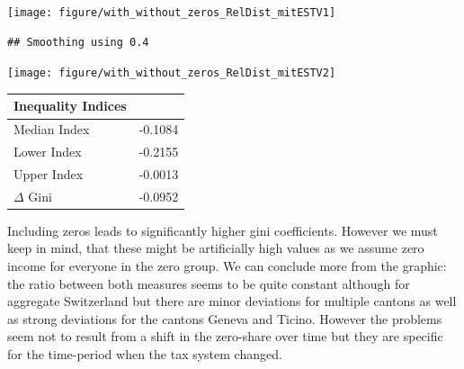 \documentclass[twoside]{article}\usepackage[]{graphicx}\usepackage[]{color}
\makeatletter
\newenvironment{kframe}{%
 \def\at@end@of@kframe{}%
 \ifinner\ifhmode%
  \def\at@end@of@kframe{\end{minipage}}%
  \begin{minipage}{\columnwidth}%
 \fi\fi%
 \def\FrameCommand##1{\hskip\@totalleftmargin \hskip-\fboxsep
 \colorbox{shadecolor}{##1}\hskip-\fboxsep
     \hskip-\linewidth \hskip-\@totalleftmargin \hskip\columnwidth}%
 \MakeFramed {\advance\hsize-\width
   \@totalleftmargin\z@ \linewidth\hsize
   \@setminipage}}%
 {\par\unskip\endMakeFramed%
 \at@end@of@kframe}
\newenvironment{knitrout}{}{} %
\makeatother
\begin{document}
\begin{multicols}{2}

\begin{knitrout}
\color{fgcolor}\begin{kframe}


{\ttfamily\noindent\bfseries\color{errorcolor}{\#\# Error: Objekt 'estvReink' nicht gefunden}}

{\ttfamily\noindent\bfseries\color{errorcolor}{\#\# Error: undefined columns selected}}\end{kframe}
\texttt{[image: figure/with\_without\_zeros\_RelDist\_mitESTV1]} 
\begin{kframe}\begin{verbatim}
## Smoothing using 0.4
\end{verbatim}
\end{kframe}
\texttt{[image: figure/with\_without\_zeros\_RelDist\_mitESTV2]} 

\end{knitrout}

%
\begin{center}
\begin{tabular}{ll}
\hline\hline
\multicolumn{1}{l}{Inequality Indices}&\multicolumn{1}{c}{}\tabularnewline
\hline
Median Index&-0.1084\tabularnewline
Lower Index&-0.2155\tabularnewline
Upper Index&-0.0013\tabularnewline
$\Delta$ Gini&-0.0952\tabularnewline
\hline
\end{tabular}
\end{center}




Including zeros leads to significantly higher gini coefficients. However we must keep in mind, that these might be artificially high values as we assume zero income for everyone in the zero group. We can conclude more from the graphic: the ratio between both measures seems to be quite constant although for aggregate Switzerland but there are minor deviations for multiple cantons as well as strong deviations for the cantons Geneva and Ticino. However the problems seem not to result from a shift in the zero-share over time but they are specific for the time-period when the tax system changed. 


\end{multicols}
\end{document}
